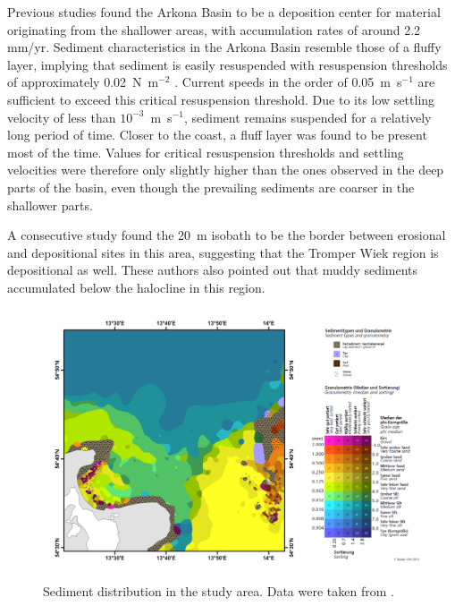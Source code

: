 Previous studies \citep[][]{leipe2000, basys1} found the Arkona Basin to be a 
deposition center for material originating from the shallower areas, with 
accumulation rates of around 2.2 mm/yr. Sediment characteristics in the Arkona 
Basin resemble those of a fluffy layer, implying that sediment is easily 
resuspended with resuspension thresholds of approximately 0.02~N~m$^{-2}$ 
\citep[][determined with a LABEREX chamber from sediment core 
samples]{basys1}. Current speeds in the order of 
0.05~m~s$^{-1}$ are sufficient to exceed this critical resuspension threshold. 
Due to its low settling velocity of less than $10^{-3}$~m~s$^{-1}$, sediment 
remains suspended for a relatively long period of time. Closer to the coast, a 
fluff layer was found to be present most of the time. Values for critical 
resuspension thresholds and settling velocities were therefore only slightly 
higher than the ones observed in the deep parts of the basin, even though the 
prevailing sediments are coarser in the shallower parts. %

A consecutive study \citep[][]{basys2} found the 20~m isobath to be the border 
between erosional and depositional sites in this area, suggesting that the 
Tromper Wiek region is depositional as well. These authors also pointed out that 
muddy sediments accumulated below the halocline in this region.

 \begin{figure}[ht]
\includegraphics[width=30pc]{bilder/TW.pdf}
 \caption{Sediment distribution in the study area. Data were taken from 
\cite{tauber2012}.}
 \label{tauberkarte}
 \end{figure}

